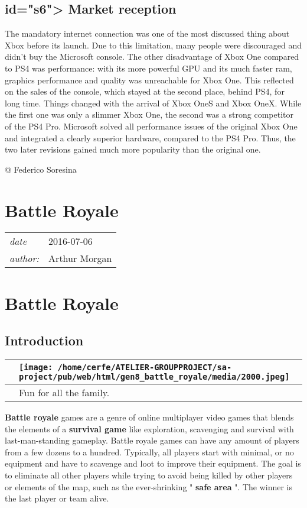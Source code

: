 \documentclass[a4paper,10pt]{book}
\newcommand{\pageHeader}[4]{
    \section{#1}
    \vspace{-0.3cm}
    \begin{table}[h!]
     \begin{tabular}{ll}
        \hline
        \textit{date} & #2 \\
        \textit{author: } & #3\\
        \hline
     \end{tabular}
    \end{table}
    \vspace{-0.3cm}
}
\begin{document}
 \subsection{ id="s6"> Market reception  }
  The mandatory internet connection was one of the most discussed thing about Xbox before its launch. Due to this limitation, many people were discouraged and didn't buy the Microsoft console. The other disadvantage of Xbox One compared to PS4 was performance: with its more powerful GPU and its much faster ram, graphics performance and quality was unreachable for Xbox One. This reflected on the sales of the console, which stayed at the second place, behind PS4, for long time.  
  Things changed with the arrival of Xbox OneS and Xbox OneX. While the first one was only a slimmer Xbox One, the second was a strong competitor of the PS4 Pro. Microsoft solved all performance issues of the original Xbox One and integrated a clearly superior hardware, compared to the PS4 Pro. Thus, the two later revisions gained much more popularity than the original one.  
 
 @ Federico Soresina 
 
 \newpage\pageHeader{Battle Royale}{2016-07-06}{Arthur Morgan}{The origins of the battle royale genre}
 \section{Battle Royale }
 \subsection{Introduction }
 \begin{longtable}{p{1mm}|l|}\hline
 
 & \texttt{[image: /home/cerfe/ATELIER-GROUPPROJECT/sa-project/pub/web/html/gen8\_battle\_royale/media/2000.jpeg]}
 \\\hline
 
 & Fun for all the family. 
 \\\hline
 \end{longtable}
 
 
 \textbf{Battle royale }  games are a genre of online multiplayer video games that blends the elements of a  \textbf{survival game }  like exploration, scavenging and survival with last-man-standing gameplay.
        Battle royale games can have any amount of players from a few dozens to a hundred. Typically, all players start with minimal, or no equipment and have to scavenge and loot to improve their equipment.
        The goal is to eliminate all other players while trying to avoid being killed by other players or elements of the map, such as the ever-shrinking " \textbf{safe area } ".
        The winner is the last player or team alive.
       
\end{document}
